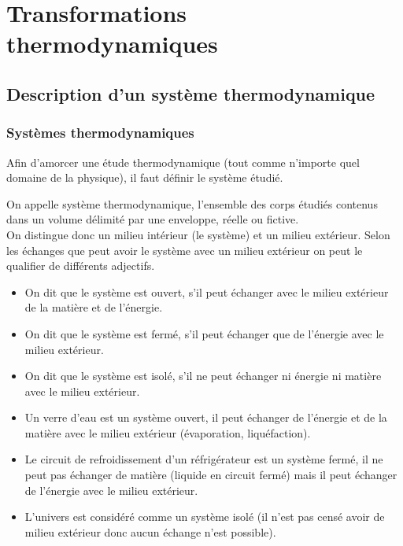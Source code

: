\chapter{Transformations thermodynamiques}
\section{Description d'un système thermodynamique}
\subsection{Systèmes thermodynamiques}
Afin d'amorcer une étude thermodynamique (tout comme n'importe quel domaine de la physique), il faut définir le système étudié.
\begin{defi}
On appelle système thermodynamique, l'ensemble des corps étudiés contenus dans un volume délimité par une enveloppe, réelle ou fictive.\\
On distingue donc un milieu intérieur (le système) et un milieu extérieur.
Selon les échanges que peut avoir le système avec un milieu extérieur on peut le qualifier de différents adjectifs.
\newline
\begin{itemize}
    \item On dit que le système est ouvert, s'il peut échanger avec le milieu extérieur de la matière et de l'énergie.
    \item On dit que le système est fermé, s'il peut échanger que de l'énergie avec le milieu extérieur.
    \item On dit que le système est isolé, s'il ne peut échanger ni énergie ni matière avec le milieu extérieur.
\end{itemize}
\end{defi}
\begin{ex}
\begin{itemize}
    \item Un verre d'eau est un système ouvert, il peut échanger de l'énergie et de la matière avec le milieu extérieur (évaporation, liquéfaction).
    \item Le circuit de refroidissement d'un réfrigérateur est un système fermé, il ne peut pas échanger de matière (liquide en circuit fermé) mais il peut échanger de l'énergie avec le milieu extérieur.
    \item L'univers est considéré comme un système isolé (il n'est pas censé avoir de milieu extérieur donc aucun échange n'est possible).
\end{itemize}
\end{ex}

